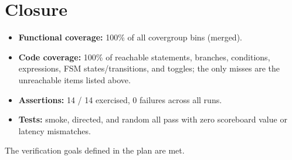 \documentclass[11pt,a4paper]{article}
\begin{document}
\section{Closure}

\begin{itemize}
  \item \textbf{Functional coverage:} 100\% of all covergroup bins (merged).
  \item \textbf{Code coverage:} 100\% of reachable statements, branches,
        conditions, expressions, FSM states/transitions, and toggles; the only
        misses are the unreachable items listed above.
  \item \textbf{Assertions:} 14 / 14 exercised, 0 failures across all runs.
  \item \textbf{Tests:} smoke, directed, and random all pass with zero scoreboard
        value or latency mismatches.
\end{itemize}

The verification goals defined in the plan are met.
\end{document}
